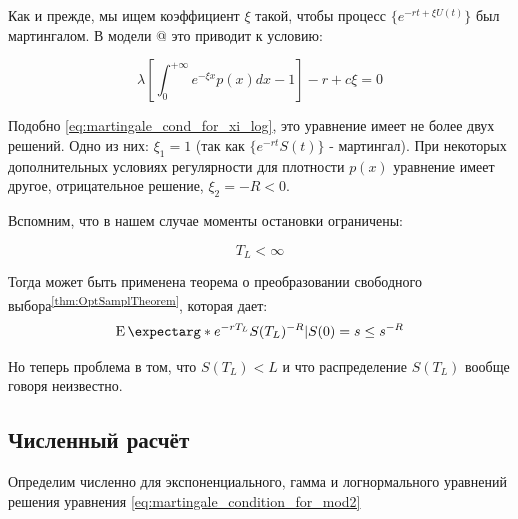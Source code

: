 \documentclass[a4paper,12pt]{article}
\makeatletter
\theoremstyle{definition}
\newcommand*{\rom}[1]{\expandafter\@slowromancap\romannumeral #1@}
\newcommand{\expect}{\operatorname{E}\expectarg}
\makeatother
\begin{document}
Как и прежде, мы ищем коэффициент $\xi$ такой, чтобы
процесс $\{e^{-rt + \xi U(t)}\}$ был мартингалом. В модели \rom{2} это приводит к условию:

\begin{equation}\label{eq:martingale_condition_for_mod2}
    \lambda \left[ \int_{0}^{+\infty} e^{-\xi x} p(x) dx - 1 \right] - r + c \xi = 0
\end{equation}

Подобно \eqref{eq:martingale_cond_for_xi_log}, это уравнение имеет не более двух решений. Одно из них: $\xi_1 = 1$ (так как $\{e^{-rt} S(t)\}$ - мартингал).
При некоторых дополнительных условиях регулярности для плотности $p(x)$ уравнение имеет другое, отрицательное решение, $\xi_2 = -R < 0$.

Вспомним, что в нашем случае моменты остановки ограничены:

\begin{equation*}
    T_L < \infty
\end{equation*}

Тогда может быть применена теорема о преобразовании свободного выбора\textsuperscript{\ref{thm:OptSamplTheorem}}, которая дает:
\begin{equation*}
    \expect*{e^{-rT_L} S(T_L)^{-R} | S(0) = s} \le s^{-R}
\end{equation*}

Но теперь проблема в том, что $S(T_L) < L$ и что
распределение $S(T_L)$ вообще говоря неизвестно.

\subsection{Численный расчёт}

Определим численно для экспоненциального, гамма и логнормального уравнений решения уравнения \eqref{eq:martingale_condition_for_mod2}
\end{document}
